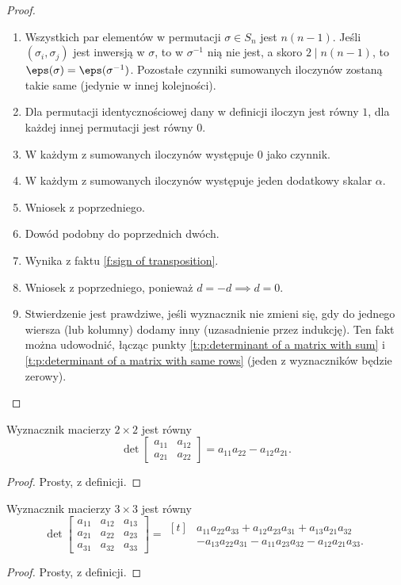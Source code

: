 \begin{proof} ~
    \begin{enumerate}
        \item Wszystkich par elementów w permutacji $\sigma \in S_n$ jest $n(n-1)$. Jeśli $(\sigma_i, \sigma_j)$ jest inwersją w $\sigma$, to w $\sigma^{-1}$ nią nie jest, a skoro $2\mid n(n-1)$, to $\eps(\sigma) = \eps(\sigma^{-1})$. Pozostałe czynniki sumowanych iloczynów zostaną takie same (jedynie w innej kolejności).
        \item Dla permutacji identycznościowej dany w definicji iloczyn jest równy $1$, dla każdej innej permutacji jest równy $0$.
        \item W każdym z sumowanych iloczynów występuje $0$ jako czynnik.
        \item W każdym z sumowanych iloczynów występuje jeden dodatkowy skalar $\alpha$.
        \item Wniosek z poprzedniego.
        \item Dowód podobny do poprzednich dwóch.
        \item Wynika z faktu \ref{f:sign of transposition}.
        \item Wniosek z poprzedniego, ponieważ $d = -d \implies d = 0$.
        \item Stwierdzenie jest prawdziwe, jeśli wyznacznik nie zmieni się, gdy do jednego wiersza (lub kolumny) dodamy inny (uzasadnienie przez indukcję). Ten fakt można udowodnić, łącząc punkty \ref{t:p:determinant of a matrix with sum} i \ref{t:p:determinant of a matrix with same rows} (jeden z wyznaczników będzie zerowy).
    \end{enumerate}
\end{proof}

\begin{theorem}
    Wyznacznik macierzy $2 \times 2$ jest równy
    \[ \det\begin{bmatrix}
        a_{11} & a_{12} \\
        a_{21} & a_{22}
    \end{bmatrix} = a_{11}a_{22} - a_{12}a_{21}. \]
\end{theorem}
\begin{proof}
    Prosty, z definicji.
\end{proof}

\begin{theorem}
    Wyznacznik macierzy $3 \times 3$ jest równy
    \[ \det\begin{bmatrix}
        a_{11} & a_{12} & a_{13} \\
        a_{21} & a_{22} & a_{23} \\
        a_{31} & a_{32} & a_{33}
    \end{bmatrix} = \begin{aligned}[t] &a_{11}a_{22}a_{33} + a_{12}a_{23}a_{31} + a_{13}a_{21}a_{32} \\
                                       &- a_{13}a_{22}a_{31} - a_{11}a_{23}a_{32} - a_{12}a_{21}a_{33}.\end{aligned} \]
\end{theorem}
\begin{proof}
    Prosty, z definicji.
\end{proof}

